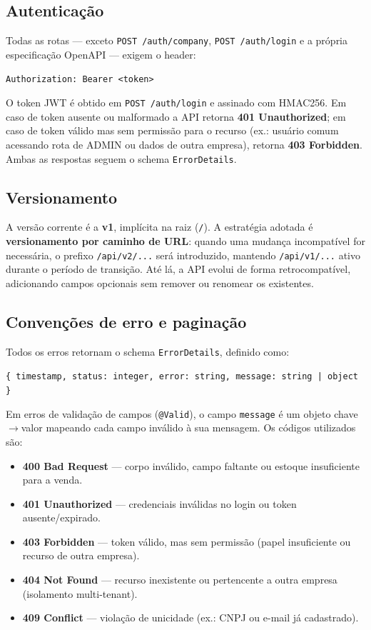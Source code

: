 \documentclass[12pt,a4paper]{article}
\begin{document}
\subsection{Autenticação}

Todas as rotas — exceto \texttt{POST /auth/company}, \texttt{POST /auth/login} e a própria especificação OpenAPI — exigem o header:

\begin{center}
\texttt{Authorization: Bearer <token>}
\end{center}

O token JWT é obtido em \texttt{POST /auth/login} e assinado com HMAC256. Em caso de token ausente ou malformado a API retorna \textbf{401 Unauthorized}; em caso de token válido mas sem permissão para o recurso (ex.: usuário comum acessando rota de ADMIN ou dados de outra empresa), retorna \textbf{403 Forbidden}. Ambas as respostas seguem o schema \texttt{ErrorDetails}.

\subsection{Versionamento}

A versão corrente é a \textbf{v1}, implícita na raiz (\texttt{/}). A estratégia adotada é \textbf{versionamento por caminho de URL}: quando uma mudança incompatível for necessária, o prefixo \texttt{/api/v2/...} será introduzido, mantendo \texttt{/api/v1/...} ativo durante o período de transição. Até lá, a API evolui de forma retrocompatível, adicionando campos opcionais sem remover ou renomear os existentes.

\subsection{Convenções de erro e paginação}

Todos os erros retornam o schema \texttt{ErrorDetails}, definido como:

\begin{center}
\texttt{\{ timestamp, status: integer, error: string, message: string | object \}}
\end{center}

Em erros de validação de campos (\texttt{@Valid}), o campo \texttt{message} é um objeto chave$\rightarrow$valor mapeando cada campo inválido à sua mensagem. Os códigos utilizados são:

\begin{itemize}
    \item \textbf{400 Bad Request} — corpo inválido, campo faltante ou estoque insuficiente para a venda.
    \item \textbf{401 Unauthorized} — credenciais inválidas no login ou token ausente/expirado.
    \item \textbf{403 Forbidden} — token válido, mas sem permissão (papel insuficiente ou recurso de outra empresa).
    \item \textbf{404 Not Found} — recurso inexistente ou pertencente a outra empresa (isolamento multi-tenant).
    \item \textbf{409 Conflict} — violação de unicidade (ex.: CNPJ ou e-mail já cadastrado).
\end{itemize}
\end{document}
